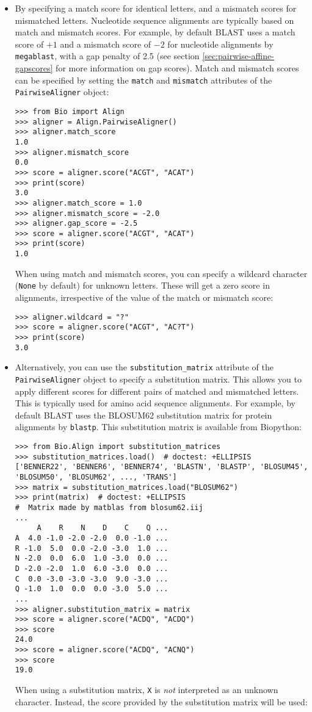 \begin{itemize}
\item By specifying a match score for identical letters, and a mismatch scores for mismatched letters. Nucleotide sequence alignments are typically based on match and mismatch scores. For example, by default BLAST \cite{altschul1990} uses a match score of $+1$ and a mismatch score of $-2$ for nucleotide alignments by \verb+megablast+, with a gap penalty of 2.5 (see section \ref{sec:pairwise-affine-gapscores} for more information on gap scores). Match and mismatch scores can be specified by setting the \verb+match+ and \verb+mismatch+ attributes of the \verb+PairwiseAligner+ object:

\begin{verbatim}
>>> from Bio import Align
>>> aligner = Align.PairwiseAligner()
>>> aligner.match_score
1.0
>>> aligner.mismatch_score
0.0
>>> score = aligner.score("ACGT", "ACAT")
>>> print(score)
3.0
>>> aligner.match_score = 1.0
>>> aligner.mismatch_score = -2.0
>>> aligner.gap_score = -2.5
>>> score = aligner.score("ACGT", "ACAT")
>>> print(score)
1.0
\end{verbatim}
When using match and mismatch scores, you can specify a wildcard character (\verb+None+ by default) for unknown letters. These will get a zero score in alignments, irrespective of the value of the match or mismatch score:
\begin{verbatim}
>>> aligner.wildcard = "?"
>>> score = aligner.score("ACGT", "AC?T")
>>> print(score)
3.0
\end{verbatim}
\item
Alternatively, you can use the \verb+substitution_matrix+ attribute of the \verb+PairwiseAligner+ object to specify a substitution matrix. This allows you to apply different scores for different pairs of matched and mismatched letters. This is typically used for amino acid sequence alignments. For example, by default BLAST \cite{altschul1990} uses the BLOSUM62 substitution matrix for protein alignments by \verb+blastp+. This substitution matrix is available from Biopython:

\begin{verbatim}
>>> from Bio.Align import substitution_matrices
>>> substitution_matrices.load()  # doctest: +ELLIPSIS
['BENNER22', 'BENNER6', 'BENNER74', 'BLASTN', 'BLASTP', 'BLOSUM45', 'BLOSUM50', 'BLOSUM62', ..., 'TRANS']
>>> matrix = substitution_matrices.load("BLOSUM62")
>>> print(matrix)  # doctest: +ELLIPSIS
#  Matrix made by matblas from blosum62.iij
...
     A    R    N    D    C    Q ...
A  4.0 -1.0 -2.0 -2.0  0.0 -1.0 ...
R -1.0  5.0  0.0 -2.0 -3.0  1.0 ...
N -2.0  0.0  6.0  1.0 -3.0  0.0 ...
D -2.0 -2.0  1.0  6.0 -3.0  0.0 ...
C  0.0 -3.0 -3.0 -3.0  9.0 -3.0 ...
Q -1.0  1.0  0.0  0.0 -3.0  5.0 ...
...
>>> aligner.substitution_matrix = matrix
>>> score = aligner.score("ACDQ", "ACDQ")
>>> score
24.0
>>> score = aligner.score("ACDQ", "ACNQ")
>>> score
19.0
\end{verbatim}
When using a substitution matrix, \verb+X+ is {\em not} interpreted as an unknown character. Instead, the score provided by the substitution matrix will be used:


\end{itemize}
